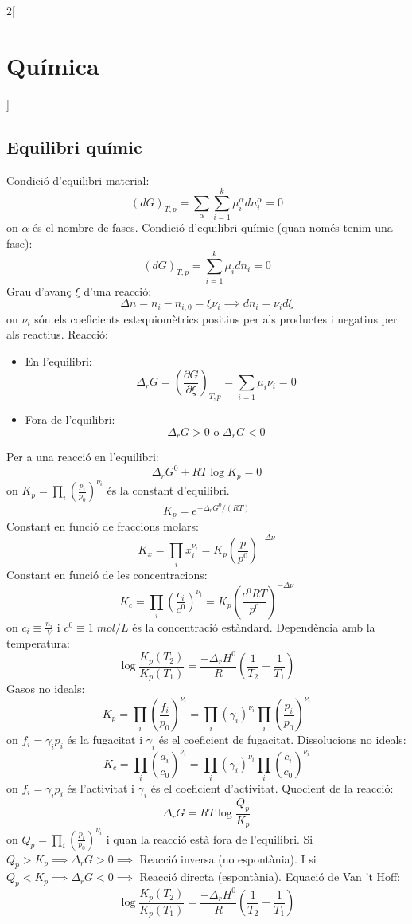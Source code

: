 \documentclass[../../../main.tex]{subfiles}
\begin{document}
\begin{multicols}{2}[\section{Química}]
\subsection{Equilibri químic}
Condició d'equilibri material:
$$(dG)_{T,p}=\sum_\alpha\sum_{i=1}^k\mu_i^\alpha dn_i^\alpha=0$$ {\footnotesize on $\alpha$ és el nombre de fases.}\newline
Condició  d'equilibri químic (quan només tenim una fase): $$(dG)_{T,p}=\sum_{i=1}^k\mu_idn_i=0$$
Grau d'avanç $\xi$ d'una reacció: $$\Delta n=n_i-n_{i,0}=\xi\nu_i\implies dn_i=\nu_id\xi$$ {\footnotesize on $\nu_i$ són els coeficients estequiomètrics positius per als productes i negatius per als reactius.}\newline
Reacció:
\begin{itemize}
    \item En l'equilibri: $$\Delta_rG=\left(\frac{\partial G}{\partial \xi}\right)_{T,p}=\sum_{i=1}\mu_i\nu_i=0$$
    \item Fora de l'equilibri: $$\Delta_rG>0\text{  o  }\Delta_rG<0$$
\end{itemize}
Per a una reacció en l'equilibri: $$\Delta_rG^0+RT\log K_p=0$$ {\footnotesize on $K_p=\prod_i\left(\frac{p_i}{p_0}\right)^{\nu_i}$ és la constant d'equilibri.}
$$K_p=e^{-\Delta_rG^0/(RT)}$$
Constant en funció de fraccions molars: $$K_x=\prod_ix_i^{\nu_i}=K_p\left(\frac{p}{p^0}\right)^{-\Delta\nu}$$
Constant en funció de les concentracions: $$K_c=\prod_i\left(\frac{c_i}{c^0}\right)^{\nu_i}=K_p\left(\frac{c^0RT}{p^0}\right)^{-\Delta\nu}$$ {\footnotesize on $c_i\equiv\frac{n_i}{V}$ i $c^0\equiv1\;mol/L$ és la concentració estàndard.}\newline
Dependència amb la temperatura: $$\log\frac{K_p(T_2)}{K_p(T_1)}=\frac{-\Delta_rH^0}{R}\left(\frac{1}{T_2}-\frac{1}{T_1}\right)$$
Gasos no ideals:
$$K_p=\prod_i\left(\frac{f_i}{p_0}\right)^{\nu_i}=\prod_i(\gamma_i)^{\nu_i}\prod_i\left(\frac{p_i}{p_0}\right)^{\nu_i}$$ {\footnotesize on $f_i=\gamma_ip_i$ és la fugacitat i $\gamma_i$ és el coeficient de fugacitat.}\newline
Dissolucions no ideals:
$$K_c=\prod_i\left(\frac{a_i}{c_0}\right)^{\nu_i}=\prod_i(\gamma_i)^{\nu_i}\prod_i\left(\frac{c_i}{c_0}\right)^{\nu_i}$$ {\footnotesize on $f_i=\gamma_ip_i$ és l'activitat i $\gamma_i$ és el coeficient d'activitat.}\newline
Quocient de la reacció: $$\Delta_rG=RT\log\frac{Q_p}{K_p}$$ {\footnotesize on $Q_p=\prod_i\left(\frac{p_i}{p_0}\right)^{\nu_i}$ i quan la reacció està fora de l'equilibri. Si $Q_p>K_p\implies\Delta_rG>0\implies$ Reacció inversa (no espontània). I si $Q_p<K_p\implies\Delta_rG<0\implies$ Reacció directa (espontània).}
Equació de Van 't Hoff: $$\log\frac{K_p(T_2)}{K_p(T_1)}=\frac{-\Delta_rH^0}{R}\left(\frac{1}{T_2}-\frac{1}{T_1}\right)$$

\end{multicols}
\end{document}
